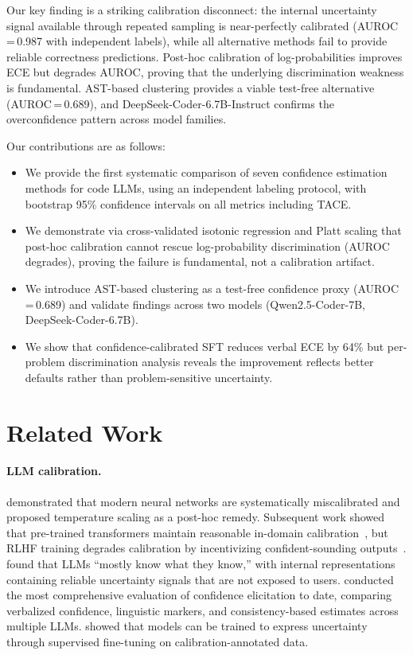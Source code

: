 \documentclass{article}
\begin{document}
Our key finding is a striking calibration disconnect: the internal uncertainty signal available through repeated sampling is near-perfectly calibrated (AUROC\,=\,0.987 with independent labels), while all alternative methods fail to provide reliable correctness predictions. Post-hoc calibration of log-probabilities improves ECE but degrades AUROC, proving that the underlying discrimination weakness is fundamental. AST-based clustering provides a viable test-free alternative (AUROC\,=\,0.689), and DeepSeek-Coder-6.7B-Instruct confirms the overconfidence pattern across model families.

Our contributions are as follows:
\begin{itemize}
  \item We provide the first systematic comparison of seven confidence estimation methods for code LLMs, using an independent labeling protocol, with bootstrap 95\% confidence intervals on all metrics including TACE.
  \item We demonstrate via cross-validated isotonic regression and Platt scaling that post-hoc calibration cannot rescue log-probability discrimination (AUROC degrades), proving the failure is fundamental, not a calibration artifact.
  \item We introduce AST-based clustering as a test-free confidence proxy (AUROC\,=\,0.689) and validate findings across two models (Qwen2.5-Coder-7B, DeepSeek-Coder-6.7B).
  \item We show that confidence-calibrated SFT reduces verbal ECE by 64\% but per-problem discrimination analysis reveals the improvement reflects better defaults rather than problem-sensitive uncertainty.
\end{itemize}

\section{Related Work}
\label{sec:related}

\paragraph{LLM calibration.}
\citet{guo2017calibration} demonstrated that modern neural networks are systematically miscalibrated and proposed temperature scaling as a post-hoc remedy. Subsequent work showed that pre-trained transformers maintain reasonable in-domain calibration~\citep{desai2020calibration}, but RLHF training degrades calibration by incentivizing confident-sounding outputs~\citep{tian2023just}. \citet{kadavath2022language} found that LLMs ``mostly know what they know,'' with internal representations containing reliable uncertainty signals that are not exposed to users. \citet{xiong2024can} conducted the most comprehensive evaluation of confidence elicitation to date, comparing verbalized confidence, linguistic markers, and consistency-based estimates across multiple LLMs. \citet{lin2022teaching} showed that models can be trained to express uncertainty through supervised fine-tuning on calibration-annotated data.
\end{document}

